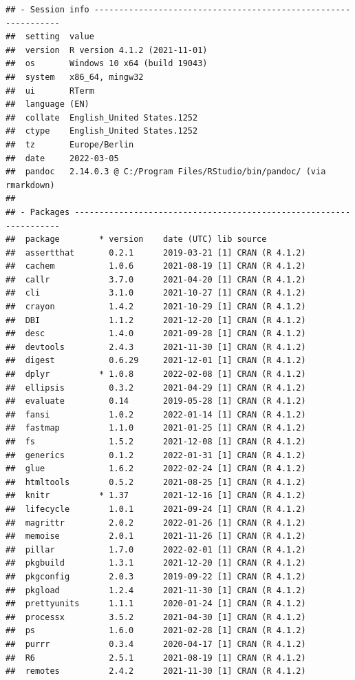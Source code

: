 \documentclass[10,a4paperpaper,]{article}
\begin{document}
\begin{verbatim}
## - Session info ---------------------------------------------------------------
##  setting  value
##  version  R version 4.1.2 (2021-11-01)
##  os       Windows 10 x64 (build 19043)
##  system   x86_64, mingw32
##  ui       RTerm
##  language (EN)
##  collate  English_United States.1252
##  ctype    English_United States.1252
##  tz       Europe/Berlin
##  date     2022-03-05
##  pandoc   2.14.0.3 @ C:/Program Files/RStudio/bin/pandoc/ (via rmarkdown)
## 
## - Packages -------------------------------------------------------------------
##  package        * version    date (UTC) lib source
##  assertthat       0.2.1      2019-03-21 [1] CRAN (R 4.1.2)
##  cachem           1.0.6      2021-08-19 [1] CRAN (R 4.1.2)
##  callr            3.7.0      2021-04-20 [1] CRAN (R 4.1.2)
##  cli              3.1.0      2021-10-27 [1] CRAN (R 4.1.2)
##  crayon           1.4.2      2021-10-29 [1] CRAN (R 4.1.2)
##  DBI              1.1.2      2021-12-20 [1] CRAN (R 4.1.2)
##  desc             1.4.0      2021-09-28 [1] CRAN (R 4.1.2)
##  devtools         2.4.3      2021-11-30 [1] CRAN (R 4.1.2)
##  digest           0.6.29     2021-12-01 [1] CRAN (R 4.1.2)
##  dplyr          * 1.0.8      2022-02-08 [1] CRAN (R 4.1.2)
##  ellipsis         0.3.2      2021-04-29 [1] CRAN (R 4.1.2)
##  evaluate         0.14       2019-05-28 [1] CRAN (R 4.1.2)
##  fansi            1.0.2      2022-01-14 [1] CRAN (R 4.1.2)
##  fastmap          1.1.0      2021-01-25 [1] CRAN (R 4.1.2)
##  fs               1.5.2      2021-12-08 [1] CRAN (R 4.1.2)
##  generics         0.1.2      2022-01-31 [1] CRAN (R 4.1.2)
##  glue             1.6.2      2022-02-24 [1] CRAN (R 4.1.2)
##  htmltools        0.5.2      2021-08-25 [1] CRAN (R 4.1.2)
##  knitr          * 1.37       2021-12-16 [1] CRAN (R 4.1.2)
##  lifecycle        1.0.1      2021-09-24 [1] CRAN (R 4.1.2)
##  magrittr         2.0.2      2022-01-26 [1] CRAN (R 4.1.2)
##  memoise          2.0.1      2021-11-26 [1] CRAN (R 4.1.2)
##  pillar           1.7.0      2022-02-01 [1] CRAN (R 4.1.2)
##  pkgbuild         1.3.1      2021-12-20 [1] CRAN (R 4.1.2)
##  pkgconfig        2.0.3      2019-09-22 [1] CRAN (R 4.1.2)
##  pkgload          1.2.4      2021-11-30 [1] CRAN (R 4.1.2)
##  prettyunits      1.1.1      2020-01-24 [1] CRAN (R 4.1.2)
##  processx         3.5.2      2021-04-30 [1] CRAN (R 4.1.2)
##  ps               1.6.0      2021-02-28 [1] CRAN (R 4.1.2)
##  purrr            0.3.4      2020-04-17 [1] CRAN (R 4.1.2)
##  R6               2.5.1      2021-08-19 [1] CRAN (R 4.1.2)
##  remotes          2.4.2      2021-11-30 [1] CRAN (R 4.1.2)

\end{verbatim}
\end{document}
